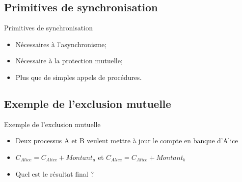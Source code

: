 \begin{frame}{\sectitle}
\def\subsectitle{Primitives de synchronisation}
\subsection{\subsectitle}

\begin{block}{\subsectitle}
\begin{itemize}
    \item Nécessaires à l'asynchronisme;
    \item Nécessaire à la protection mutuelle;
    \item Plus que de simples appels de procédures.
\end{itemize}
\end{block}

\def\subsectitle{Exemple de l'exclusion mutuelle}
\subsection{\subsectitle}

\begin{exampleblock}{\subsectitle}
\begin{itemize}
    \item Deux processus A et B veulent mettre à jour le compte en banque
    d'Alice
    \item $C_{Alice} = C_{Alice} + Montant_{a}$ et $C_{Alice} = C_{Alice} +
    Montant_{b}$
    \item Quel est le résultat final ?
\end{itemize}
\end{exampleblock}

\end{frame}


